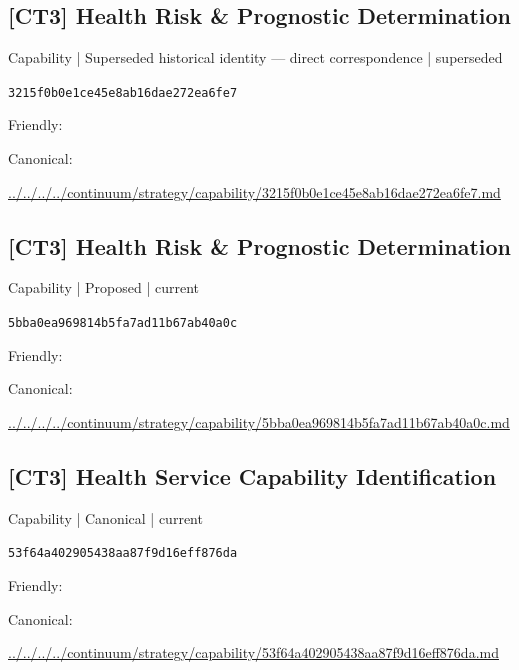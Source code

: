 \documentclass[10pt,a4paper]{article}
\begin{document}
\subsection*{[CT3] Health Risk \& Prognostic Determination}
{\small Capability | Superseded historical identity — direct correspondence | superseded}\par
\texttt{3215f0b0e1ce45e8ab16dae272ea6fe7}\par
Friendly: \par
Canonical: \par
{\footnotesize\url{../../../../continuum/strategy/capability/3215f0b0e1ce45e8ab16dae272ea6fe7.md}}\par
\subsection*{[CT3] Health Risk \& Prognostic Determination}
{\small Capability | Proposed | current}\par
\texttt{5bba0ea969814b5fa7ad11b67ab40a0c}\par
Friendly: \par
Canonical: \par
{\footnotesize\url{../../../../continuum/strategy/capability/5bba0ea969814b5fa7ad11b67ab40a0c.md}}\par
\subsection*{[CT3] Health Service Capability Identification}
{\small Capability | Canonical | current}\par
\texttt{53f64a402905438aa87f9d16eff876da}\par
Friendly: \par
Canonical: \par
{\footnotesize\url{../../../../continuum/strategy/capability/53f64a402905438aa87f9d16eff876da.md}}\par
\end{document}
